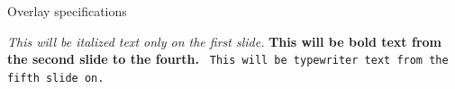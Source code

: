 \documentclass{beamer}
\begin{document}
\begin{frame}{Overlay specifications}

\textit<1>{
    This will be italized text only on the first slide.}
\textbf<2-4>{
    This will be bold text from the second slide to the fourth.}
\texttt<5->{
    This will be typewriter text from the fifth slide on.}

\end{frame}
\end{document}
